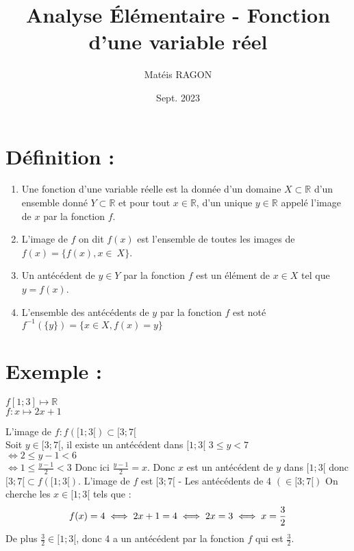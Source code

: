 \documentclass{article}
\author{Matéis RAGON}
\title{Analyse Élémentaire - Fonction d'une variable réel}
\date{Sept. 2023}
\begin{document}
	\maketitle
	
	\section*{Définition :} 	
		\begin{enumerate}
  			\item Une fonction d'une variable réelle est la donnée d'un domaine $X \subset \mathbb{R}$ d'un ensemble donné $Y \subset \mathbb{R}$ et pour tout $x \in \mathbb{R}$, d'un unique $y\in\mathbb{R}$ appelé l'image de $x$ par la fonction $f$.
			\item L'image de $f$ on dit $f(x)$ est l'ensemble de toutes les images de $f(x)=\{ f(x), x\in\ X \}$.
			\item Un antécédent de $y \in Y$ par la fonction $f$ est un élément de $x\in X$ tel que $y=f(x)$.
			\item L'ensemble des antécédents de $y$ par la fonction $f$ est noté $f^{-1}(\{ y \})=\{ x \in X, f(x)=y \}$
		\end{enumerate}
	
	\section*{Exemple :}
		$f[ 1; 3] \mapsto \mathbb{R}$ \\
		$f: x\mapsto 2x+1$

		L'image de $f: f([1;3[) \subset [3; 7[$ \\
		Soit $y\in[3; 7[$, il existe un antécédent dans $[1;3[$
		$3 \leqslant y < 7$ \\
		$\iff 2 \leqslant y-1 < 6$ \\
		$\iff 1 \leqslant \frac{y-1}{2} < 3$
		Donc ici $\frac{y-1}{2} = x$.
		Donc $x$ est un antécédent de $y$ dans $[1;3[$ donc $[3;7[ \subset f([1;3[)$.
		L'image de $f$ est $[3;7[$
		- Les antécédents de 4 $(\in [3;7[)$
		On cherche les $x\in [1;3[$ tels que :
		$$
		f(x)=4 \\
		\iff 2x+1=4 \\
		\iff 2x=3 \\
		\iff x=\frac3 2
		$$
		De plus $\frac 3 2 \in [1;3[$, donc 4 a un antécédent par la fonction $f$ qui est $\frac3 2$.
\end{document}
